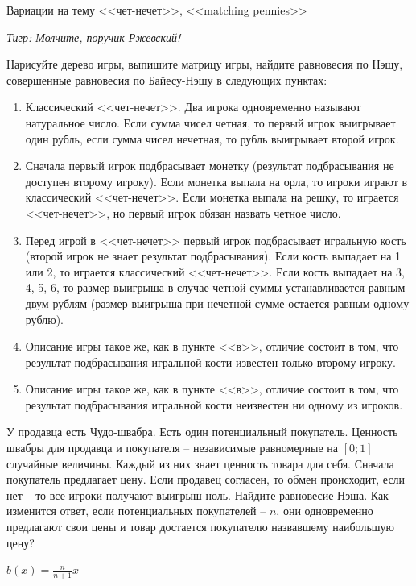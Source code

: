 \begin{problem}
 Вариации на тему <<чет-нечет>>, <<matching pennies>>\par
{\it Тигр: Молчите, поручик Ржевский!}\par
Нарисуйте дерево игры, выпишите матрицу игры, найдите равновесия по Нэшу, совершенные равновесия по Байесу-Нэшу в следующих пунктах:\par
\begin{enumerate}
\item Классический <<чет-нечет>>. Два игрока одновременно называют натуральное число. Если сумма чисел четная, то первый игрок выигрывает один рубль, если сумма чисел нечетная, то рубль выигрывает второй игрок.\par
\item Сначала первый игрок подбрасывает монетку (результат подбрасывания не доступен второму игроку). Если монетка выпала на орла, то игроки играют в классический <<чет-нечет>>. Если монетка выпала на решку, то играется <<чет-нечет>>, но первый игрок обязан назвать четное число.\par
\item  Перед игрой в <<чет-нечет>> первый игрок подбрасывает игральную кость (второй игрок не знает результат подбрасывания). Если кость выпадает на 1 или 2, то играется классический <<чет-нечет>>. Если кость выпадает на 3, 4, 5, 6, то размер выигрыша в случае четной суммы устанавливается равным двум рублям (размер выигрыша при нечетной сумме остается равным одному рублю).\par
\item Описание игры такое же, как в пункте <<в>>, отличие состоит в том, что результат подбрасывания игральной кости известен только второму игроку.\par
\item Описание игры такое же, как в пункте <<в>>, отличие состоит в том, что результат подбрасывания игральной кости неизвестен ни одному из игроков.
\end{enumerate}


\begin{sol}

\end{sol}
\end{problem}






\begin{problem}
У продавца есть Чудо-швабра. Есть один потенциальный покупатель. Ценность швабры для продавца и покупателя -- независимые равномерные на $[0;1]$ случайные величины. Каждый из них знает ценность товара для себя. Сначала покупатель предлагает цену. Если продавец согласен, то обмен происходит, если нет -- то все игроки получают выигрыш ноль. Найдите равновесие Нэша. Как изменится ответ, если потенциальных покупателей -- $n$, они одновременно предлагают свои цены и товар достается покупателю назвавшему наибольшую цену?



\begin{sol}
$b(x)=\frac{n}{n+1}x$
\end{sol}
\end{problem}

